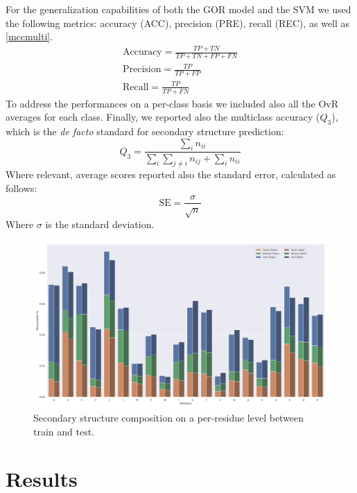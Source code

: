 \documentclass[nocrop]{bioinfo}
\begin{document}
\begin{methods}
For the generalization capabilities of both the GOR model and the SVM we used the following metrics: accuracy (ACC), precision (PRE), recall (REC), as well as \eqref{mccmulti}.
\begin{gather}
	\text{Accuracy} = \frac{TP+TN}{TP+TN+FP+FN} \\
	\text{Precision} = \frac{TP}{TP+FP} \\
	\text{Recall} = \frac{TP}{TP+FN}
\end{gather}
To address the performances on a per-class basis we included also all the OvR averages for each class.
Finally, we reported also the multiclass accuracy ($Q_3$), which is the \textit{de facto} standard for secondary structure prediction:
\begin{equation}
Q_3  = \frac{\sum_i n_{ii}}{\sum_i \sum_{j \neq i} n_{ij}+\sum_i n_{ii}}
\end{equation}
Where relevant, average scores reported also the standard error, calculated as follows:
\begin{equation}
	\text{SE} = \frac{\sigma}{\sqrt{n}}
\end{equation}
Where $\sigma$ is the standard deviation.
\end{methods}

\begin{figure}[!tb]
	\includegraphics[width=\textwidth]{fraction_ss.png}
	\caption{Secondary structure composition on a per-residue level between train and test.}\label{fig:frac_ss}
\end{figure}
\section{Results}
\end{document}
